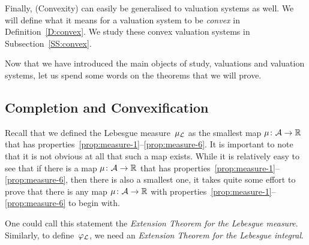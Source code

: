 \documentclass[main.tex]{subfiles}
\begin{document}
Finally,
(Convexity)
can easily be generalised to valuation systems as well.
We will define what it means
for a valuation system to be \emph{convex}
in  Definition~\ref{D:convex}.
We study these convex valuation systems in Subsection~\ref{SS:convex}.

\vspace{1em}
\noindent
Now that we have introduced
the main objects of study,
valuations and valuation systems,
let us spend some words on the theorems that we will prove.


\subsection{Completion and Convexification}
Recall that we defined
the Lebesgue measure~$\mu_{\mathcal{L}}$
as the smallest map $\mu\colon \mathcal{A}\rightarrow \mathbb{R}$
that has properties~\ref{prop:measure-1}--\ref{prop:measure-6}.
It is important to note that
it is not obvious at all that such a map exists.
While it is relatively easy to see
that if there is a map $\mu\colon \mathcal{A} \rightarrow \mathbb{R}$
that has properties~\ref{prop:measure-1}--\ref{prop:measure-6},
then there is also a smallest one,
it takes quite some effort
to prove that there is any map $\mu\colon \mathcal{A}\rightarrow \mathbb{R}$
with properties~\ref{prop:measure-1}--\ref{prop:measure-6} to begin with.

One could call this statement the \emph{Extension Theorem
for the Lebesgue measure}.
Similarly,
to define~$\varphi_{\mathcal{L}}$,
we need an \emph{Extension Theorem
for the Lebesgue integral}.
\end{document}
